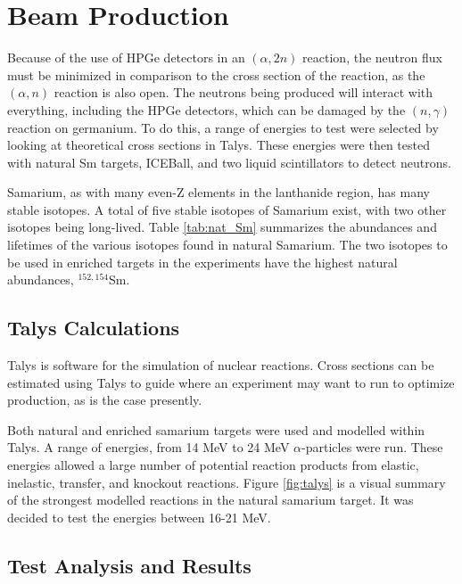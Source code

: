 \section{Beam Production}

Because of the use of HPGe detectors in an $(\alpha,2n)$ reaction, the neutron flux must be minimized in comparison to the cross section of the reaction, as the $(\alpha,n)$ reaction is also open. The neutrons being produced will interact with everything, including the HPGe detectors, which can be damaged by the $(n,\gamma)$ reaction on germanium. To do this, a range of energies to test were selected by looking at theoretical cross sections in Talys\citep{koning07:_talys}. These energies were then tested with natural Sm targets, ICEBall, and two liquid scintillators to detect neutrons.

Samarium, as with many even-Z elements in the lanthanide region, has many stable isotopes. A total of five stable isotopes of Samarium exist, with two other isotopes being long-lived. Table \ref{tab:nat_Sm} summarizes the abundances and lifetimes of the various isotopes found in natural Samarium. The two isotopes to be used in enriched targets in the experiments have the highest natural abundances, $^{152,154}$Sm.



\subsection{Talys Calculations}

Talys \citep{koning07:_talys} is software for the simulation of nuclear reactions. Cross sections can be estimated using Talys to guide where an experiment may want to run to optimize production, as is the case presently. 

Both natural and enriched samarium targets were used and modelled within Talys. A range of energies, from 14 MeV to 24 MeV $\alpha$-particles were run. These energies allowed a large number of potential reaction products from elastic, inelastic, transfer, and knockout reactions. Figure \ref{fig:talys} is a visual summary of the strongest modelled reactions in the natural samarium target. It was decided to test the energies between 16-21 MeV.



\subsection{Test Analysis and Results}

